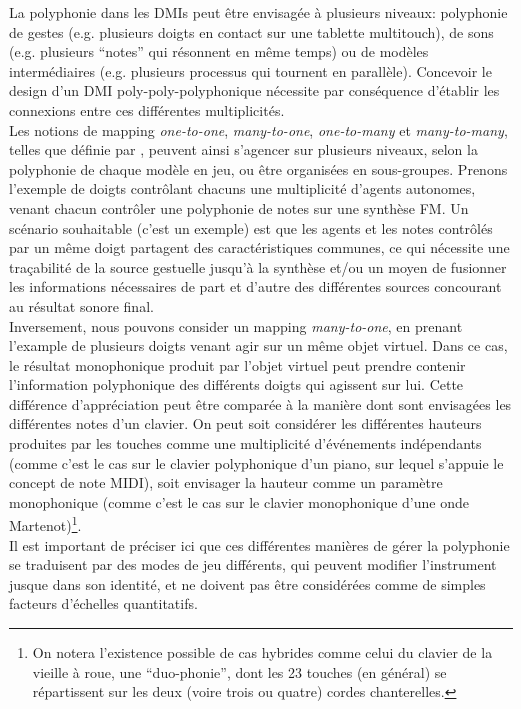 \noindent La polyphonie dans les \glspl{DMI} peut être envisagée à plusieurs niveaux: polyphonie de gestes (e.g. plusieurs doigts en contact sur une tablette multitouch), de sons (e.g. plusieurs ``notes'' qui résonnent en même temps) ou de modèles intermédiaires (e.g. plusieurs processus qui tournent en parallèle). Concevoir le design d'un \gls{DMI} poly-poly-polyphonique nécessite par conséquence d'établir les connexions entre ces différentes multiplicités.\\
\indent Les notions de mapping \textit{one-to-one}, \textit{many-to-one}, \textit{one-to-many} et \textit{many-to-many}, telles que définie par \cite{hunt_mapping_2002}, peuvent ainsi s'agencer sur plusieurs niveaux, selon la polyphonie de chaque modèle en jeu, ou être organisées en sous-groupes. Prenons l'exemple de doigts contrôlant chacuns une multiplicité d'agents autonomes, venant chacun contrôler une polyphonie de notes sur une synthèse \gls{FM}. Un scénario souhaitable (c'est un exemple) est que les agents et les notes contrôlés par un même doigt partagent des caractéristiques communes, ce qui nécessite une traçabilité de la source gestuelle jusqu'à la synthèse et/ou un moyen de fusionner les informations nécessaires de part et d'autre des différentes sources concourant au résultat sonore final.\\
\indent Inversement, nous pouvons consider un mapping \textit{many-to-one}, en prenant l'example de plusieurs doigts venant agir sur un même objet virtuel. Dans ce cas, le résultat monophonique produit par l'objet virtuel peut prendre contenir l'information polyphonique des différents doigts qui agissent sur lui. Cette différence d'appréciation peut être comparée à la manière dont sont envisagées les différentes notes d'un clavier. On peut soit considérer les différentes hauteurs produites par les touches comme une multiplicité d'événements indépendants (comme c'est le cas sur le clavier polyphonique d'un piano, sur lequel s'appuie le concept de note \gls{MIDI}), soit envisager la hauteur comme un paramètre monophonique (comme c'est le cas sur le clavier monophonique d'une onde Martenot)\footnote{On notera l'existence possible de cas hybrides comme celui du clavier de la vieille à roue, une ``duo-phonie'', dont les 23 touches (en général) se répartissent sur les deux (voire trois ou quatre) cordes chanterelles.}.\\
\indent Il est important de préciser ici que ces différentes manières de gérer la polyphonie se traduisent par des modes de jeu différents, qui peuvent modifier l'instrument jusque dans son identité, et ne doivent pas être considérées comme de simples facteurs d'échelles quantitatifs.

